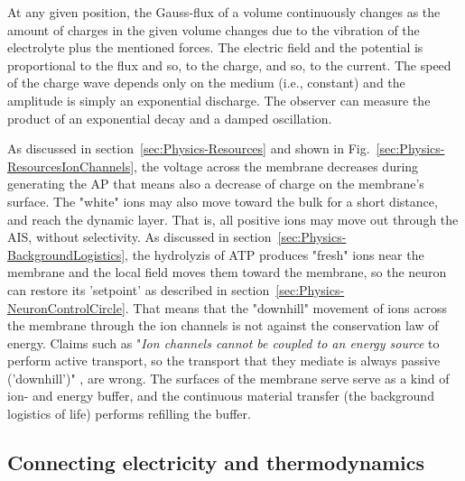 At any given position,
the Gauss-flux of a volume continuously changes as the amount of
charges in the given volume changes due to the vibration of the electrolyte plus the mentioned forces. The electric field and
the potential is proportional to the flux and so, to the charge, and so, to the current.
The speed of the charge wave
depends only on the medium (i.e., constant) and
the amplitude is simply an exponential discharge.
The observer can measure the product of an exponential decay and a
damped oscillation. 

As discussed in section~\ref{sec:Physics-Resources} and shown in
Fig.~\ref{sec:Physics-ResourcesIonChannels}, the voltage 
across the membrane decreases during generating the \gls{AP}
that means also a decrease of charge on the membrane's surface. The "white" ions may also move toward the bulk for a short distance,
and reach the dynamic layer.
That is, all positive ions may move out through the \gls{AIS},
without selectivity. 
As discussed in section~\ref{sec:Physics-BackgroundLogistics},
the hydrolyzis of \gls{ATP} produces "fresh" ions near the 
membrane and the local field moves them toward the membrane,
so the neuron can restore its '\gls{setpoint}' as described in 
section~\ref{sec:Physics-NeuronControlCircle}. That means that 
the "downhill" movement of ions across the membrane through 
the ion channels is not against the conservation law of energy.
Claims such as "\textit{Ion channels cannot be coupled to an energy source} to perform active transport,
so the transport that they mediate is always passive ('downhill')" \cite{MolecularBiology:2002}, are wrong.
The surfaces of the membrane serve serve as a kind of 
ion- and energy buffer, and the continuous material transfer
(the background logistics of life) performs
refilling the buffer. 
 


\subsection[The Magic Connection]{Connecting electricity and thermodynamics\label{sec:Physics-MagicConnection}}

